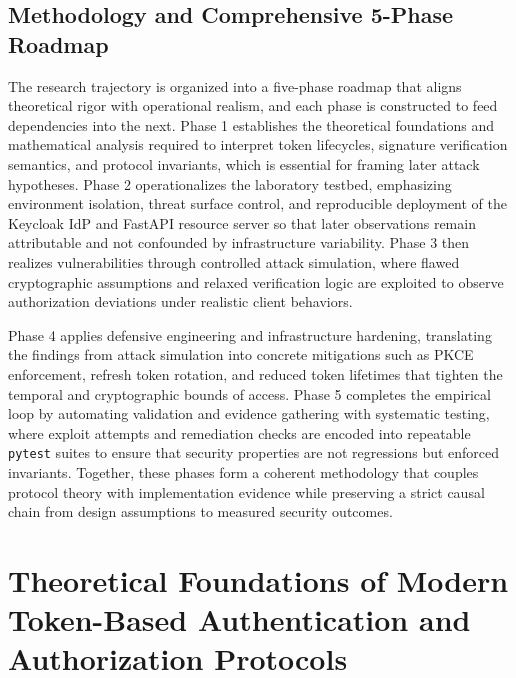 \documentclass[11pt,a4paper]{report}
\begin{document}
\section{Methodology and Comprehensive 5-Phase Roadmap}
\label{sec:methodology}
The research trajectory is organized into a five-phase roadmap that aligns theoretical rigor with operational realism, and each phase is constructed to feed dependencies into the next. Phase 1 establishes the theoretical foundations and mathematical analysis required to interpret token lifecycles, signature verification semantics, and protocol invariants, which is essential for framing later attack hypotheses. Phase 2 operationalizes the laboratory testbed, emphasizing environment isolation, threat surface control, and reproducible deployment of the Keycloak IdP and FastAPI resource server so that later observations remain attributable and not confounded by infrastructure variability. Phase 3 then realizes vulnerabilities through controlled attack simulation, where flawed cryptographic assumptions and relaxed verification logic are exploited to observe authorization deviations under realistic client behaviors.

Phase 4 applies defensive engineering and infrastructure hardening, translating the findings from attack simulation into concrete mitigations such as PKCE enforcement, refresh token rotation, and reduced token lifetimes that tighten the temporal and cryptographic bounds of access. Phase 5 completes the empirical loop by automating validation and evidence gathering with systematic testing, where exploit attempts and remediation checks are encoded into repeatable \texttt{pytest} suites to ensure that security properties are not regressions but enforced invariants. Together, these phases form a coherent methodology that couples protocol theory with implementation evidence while preserving a strict causal chain from design assumptions to measured security outcomes.


\chapter{Theoretical Foundations of Modern Token-Based Authentication and Authorization Protocols}
\label{chap:theory}
\end{document}
